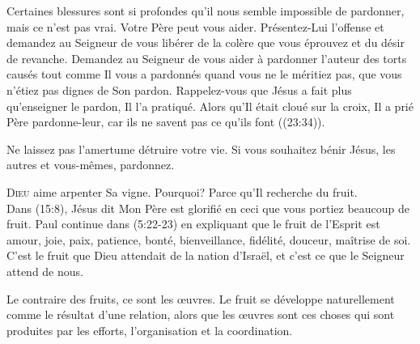 Certaines blessures sont si profondes qu'il nous semble impossible
 de pardonner, mais ce n'est pas vrai. Votre Père peut vous aider.
 Présentez-Lui  l'offense et demandez 
 au Seigneur de vous libérer de la colère que vous éprouvez
 et du désir de revanche. Demandez au Seigneur de vous aider à pardonner
 l'auteur des torts causés \ocadr tout comme Il vous a pardonnés
 quand vous ne le méritiez pas, que vous n'étiez pas dignes de Son pardon.
 Rappelez-vous que Jésus a fait plus qu'enseigner le pardon, Il l'a pratiqué.
 Alors qu'Il était cloué sur la croix, Il a prié\frcolon{} 
 \Og Père pardonne-leur, car ils ne savent pas ce qu'ils font \Fg{}
 ((23:34)).

Ne laissez pas l'amertume détruire votre vie.
 Si vous souhaitez bénir Jésus, les autres et vous-mêmes, pardonnez.

\dvrule







\lettrine{D}{ieu} aime arpenter Sa vigne.
 Pourquoi? Parce qu'Il recherche du fruit. \\[1ex]
Dans (15:8), Jésus dit\frcolon{} 
 \Og Mon Père est glorifié en ceci\frcolon{} que vous portiez beaucoup de fruit. \Fg{}
 Paul continue dans (5:22-23) en expliquant que le fruit
 de l'Esprit est \Og amour, joie, paix, patience, bonté, bienveillance,
 fidélité, douceur, maîtrise de soi. \Fg{}
 C'est le fruit que Dieu attendait de la nation d'Israël,
 et c'est ce que le Seigneur attend de nous.


Le contraire des fruits, ce sont les \oe{}uvres.
 Le fruit se développe naturellement comme le résultat d'une relation,
 alors que les \oe{}uvres sont ces choses qui sont produites par les efforts,
 l'organisation et la coordination.

